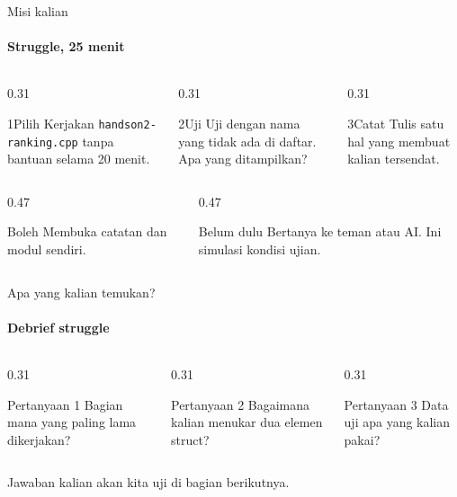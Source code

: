\documentclass[t]{beamer}
\begin{document}
\begin{frame}{Misi kalian}
\framesubtitle{Struggle, 25 menit}
\begin{columns}[T]
\begin{column}{0.31\textwidth}
\begin{Langkah}{1}{Pilih}
Kerjakan \texttt{handson2-ranking.cpp} tanpa bantuan selama 20 menit.
\end{Langkah}
\end{column}
\begin{column}{0.31\textwidth}
\begin{Langkah}{2}{Uji}
Uji dengan nama yang tidak ada di daftar. Apa yang ditampilkan?
\end{Langkah}
\end{column}
\begin{column}{0.31\textwidth}
\begin{Langkah}{3}{Catat}
Tulis satu hal yang membuat kalian tersendat.
\end{Langkah}
\end{column}
\end{columns}
\vspace{8pt}
\begin{columns}[T]
\begin{column}{0.47\textwidth}
\begin{Blok}{Boleh}
Membuka catatan dan modul sendiri.
\end{Blok}
\end{column}
\begin{column}{0.47\textwidth}
\begin{BlokAlert}{Belum dulu}
Bertanya ke teman atau AI. Ini simulasi kondisi ujian.
\end{BlokAlert}
\end{column}
\end{columns}
\end{frame}

\begin{frame}{Apa yang kalian temukan?}
\framesubtitle{Debrief struggle}
\begin{columns}[T]
\begin{column}{0.31\textwidth}
\begin{BlokGelap}{Pertanyaan 1}
Bagian mana yang paling lama dikerjakan?
\end{BlokGelap}
\end{column}
\begin{column}{0.31\textwidth}
\begin{BlokGelap}{Pertanyaan 2}
Bagaimana kalian menukar dua elemen struct?
\end{BlokGelap}
\end{column}
\begin{column}{0.31\textwidth}
\begin{BlokGelap}{Pertanyaan 3}
Data uji apa yang kalian pakai?
\end{BlokGelap}
\end{column}
\end{columns}
\vspace{10pt}
Jawaban kalian akan kita uji di bagian berikutnya.
\end{frame}
\end{document}
